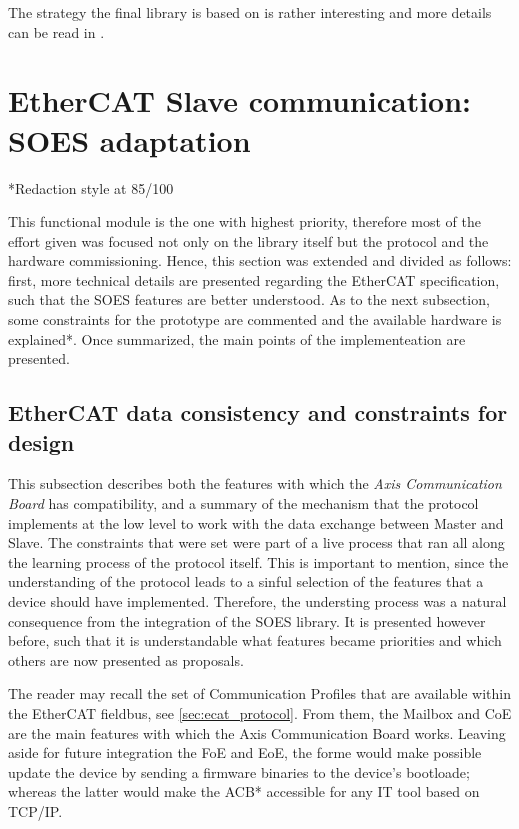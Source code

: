 The strategy the final library is based on is rather interesting and more details can be read in \cite{onewire_theory}.

\section{EtherCAT Slave communication: SOES adaptation}\label{sec:soes}
*Redaction style at 85/100

This functional module is the one with highest priority, therefore most of the effort given was focused not only 
on the library itself but the protocol and the hardware commissioning. Hence, this section was extended and divided
as follows: first, more technical details are presented regarding the EtherCAT specification, such that the SOES
features are better understood. As to the next subsection, some constraints for the prototype are commented and the 
available hardware is explained*. Once summarized, the main points of the implementeation are presented.

\subsection{EtherCAT data consistency and constraints for design}\label{sec:ecat_sms}
This subsection describes both the features with which the \emph{Axis Communication Board} has compatibility, and a summary of the mechanism that the protocol
implements at the low level to work with the data exchange between Master and Slave. The constraints that were set were part of a live process that ran all along
the learning process of the protocol itself. This is important to mention, since the understanding of the protocol leads to a sinful selection of the features
that a device should have implemented. Therefore, the understing process was a natural consequence from the integration of the SOES library. It is presented however before, such that 
it is understandable what features became priorities and which others are now presented as proposals.

The reader may recall the set of Communication Profiles that are available within the EtherCAT fieldbus, see \ref{sec:ecat_protocol}. From them, the Mailbox and CoE 
are the main features with which the Axis Communication Board works. Leaving aside for future integration the FoE and EoE, the forme would make possible 
update the device by sending a firmware binaries to the device's bootloade; whereas the latter would make the ACB* accessible for any IT tool based on TCP/IP.




